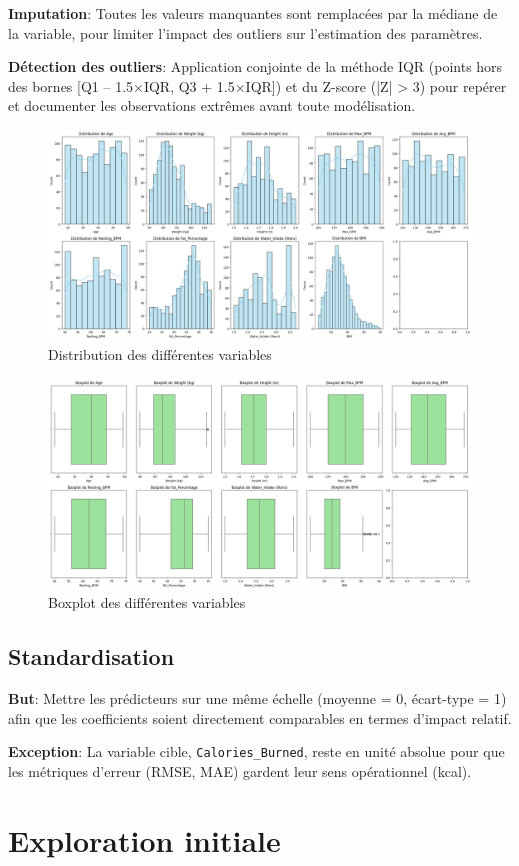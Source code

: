 \documentclass[12pt,a4paper]{article}
\begin{document}
\textbf{Imputation}:
Toutes les valeurs manquantes sont remplacées par la médiane de la variable, pour limiter l’impact des outliers sur l’estimation des paramètres.

\textbf{Détection des outliers}:
Application conjointe de la méthode IQR (points hors des bornes [Q1 – 1.5×IQR, Q3 + 1.5×IQR]) et du Z-score (|Z| > 3) pour repérer et documenter les observations extrêmes avant toute modélisation.

\begin{figure}[H]
  \centering
  \includegraphics[width=0.7\linewidth]{distribution.png}
  \caption{Distribution des différentes variables}
\end{figure}

\begin{figure}[H]
  \centering
  \includegraphics[width=0.7\linewidth]{boxplot.png}
  \caption{Boxplot des différentes variables}
\end{figure}

\subsection{Standardisation}
\textbf{But}:
Mettre les prédicteurs sur une même échelle (moyenne = 0, écart-type = 1) afin que les coefficients soient directement comparables en termes d’impact relatif.

\textbf{Exception}:
La variable cible, \texttt{Calories\_Burned}, reste en unité absolue pour que les métriques d’erreur (RMSE, MAE) gardent leur sens opérationnel (kcal).


\section{Exploration initiale}
\end{document}
